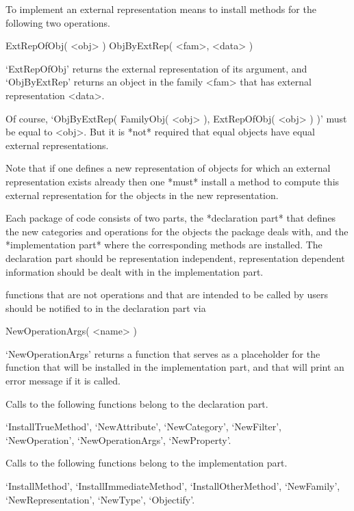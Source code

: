 To implement an external representation means to install methods for the
following two operations.

\>ExtRepOfObj( <obj> )
\>ObjByExtRep( <fam>, <data> )

`ExtRepOfObj' returns the external representation of its argument,
and `ObjByExtRep' returns an object in the family <fam> that has
external representation <data>.

Of course, `ObjByExtRep( FamilyObj( <obj> ), ExtRepOfObj( <obj> ) )'
must be equal to <obj>.
But it is *not* required that equal objects have equal external
representations.

Note that if one defines a new representation of objects for which an
external representation exists already
then one *must* install a method to compute this external representation
for the objects in the new representation.



Each package of {\GAP} code consists of two parts,
the *declaration part* that defines the new categories and operations for
the objects the package deals with,
and the *implementation part* where the corresponding methods are
installed.
The declaration part should be representation independent,
representation dependent information should be dealt with in the
implementation part.

{\GAP} functions that are not operations and that are intended to be
called by users should be notified to {\GAP} in the declaration part via

\>NewOperationArgs( <name> )

`NewOperationArgs' returns a function that serves as a placeholder
for the function that will be installed in the implementation part,
and that will print an error message if it is called.



Calls to the following functions belong to the declaration part.

`InstallTrueMethod',
`NewAttribute',
`NewCategory',
`NewFilter',
`NewOperation',
`NewOperationArgs',
`NewProperty'.

Calls to the following functions belong to the implementation part.

`InstallMethod',
`InstallImmediateMethod',
`InstallOtherMethod',
`NewFamily',
`NewRepresentation',
`NewType',
`Objectify'.


